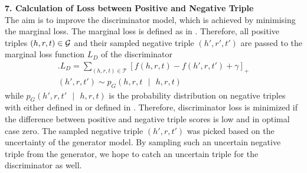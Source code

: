 \textbf{7. Calculation of Loss between Positive and Negative Triple}\\
%
The aim is to improve the discriminator model, which is achieved by minimising the marginal loss.
The marginal loss is defined as in .
Therefore, all positive triples $(h,r,t) \in \mathcal{G}$ and their sampled negative triple $(h',r', t')$  are passed to the marginal loss function $L_D$ of the discriminator
\begin{multline} \label{eq:marginalloss2}.
    L_D =\sum_{(h,r,t) \in \mathcal{T}}[f(h,r,t) - f(h',r,t')+\gamma]_+\\
    (h',r,t') \sim p_G(h,r,t\text{ }|\text{ }h,r,t) 
\end{multline}
while $p_G(h', r, t'\text{ }|\text{ }h, r, t)$ is the probability distribution on negative triples with either \usmax defined in  or \ussoftmax defined in .
Therefore, discriminator loss is minimized if the difference between positive and negative triple scores is low and in optimal case zero.
The sampled negative triple $(h',r,t')$ was picked based on the uncertainty of the generator model.
By sampling such an uncertain negative triple from the generator, we hope to catch an uncertain triple for the discriminator as well.